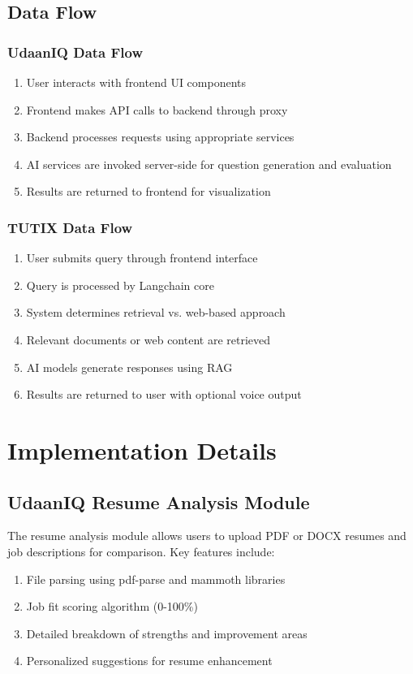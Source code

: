 \documentclass[12pt, conference]{IEEEtran}
\begin{document}
\subsection{Data Flow}

\subsubsection{UdaanIQ Data Flow}
\begin{enumerate}
    \item User interacts with frontend UI components
    \item Frontend makes API calls to backend through proxy
    \item Backend processes requests using appropriate services
    \item AI services are invoked server-side for question generation and evaluation
    \item Results are returned to frontend for visualization
\end{enumerate}

\subsubsection{TUTIX Data Flow}
\begin{enumerate}
    \item User submits query through frontend interface
    \item Query is processed by Langchain core
    \item System determines retrieval vs. web-based approach
    \item Relevant documents or web content are retrieved
    \item AI models generate responses using RAG
    \item Results are returned to user with optional voice output
\end{enumerate}

\section{Implementation Details}

\subsection{UdaanIQ Resume Analysis Module}

The resume analysis module allows users to upload PDF or DOCX resumes and job descriptions for comparison. Key features include:
\begin{enumerate}
    \item File parsing using pdf-parse and mammoth libraries
    \item Job fit scoring algorithm (0-100\%)
    \item Detailed breakdown of strengths and improvement areas
    \item Personalized suggestions for resume enhancement
\end{enumerate}
\end{document}
